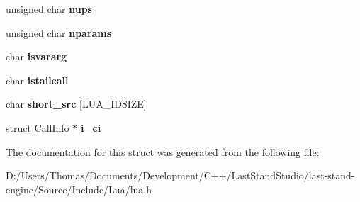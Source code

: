 \begin{DoxyCompactItemize}
\item 
\hypertarget{structlua__Debug_ab87c2a6ef686abf10da683f7e9af1b23}{}unsigned char {\bfseries nups}\label{structlua__Debug_ab87c2a6ef686abf10da683f7e9af1b23}

\item 
\hypertarget{structlua__Debug_adb5efd1576224ce9d14f42f8bfee7a1a}{}unsigned char {\bfseries nparams}\label{structlua__Debug_adb5efd1576224ce9d14f42f8bfee7a1a}

\item 
\hypertarget{structlua__Debug_a943220c57a4dd46dcc1bcd1198cfea88}{}char {\bfseries isvararg}\label{structlua__Debug_a943220c57a4dd46dcc1bcd1198cfea88}

\item 
\hypertarget{structlua__Debug_a08e9cf647790ffeb068db293c7572260}{}char {\bfseries istailcall}\label{structlua__Debug_a08e9cf647790ffeb068db293c7572260}

\item 
\hypertarget{structlua__Debug_a9b953c2fa9ef95a72a9ffc423744e1a4}{}char {\bfseries short\+\_\+src} \mbox{[}L\+U\+A\+\_\+\+I\+D\+S\+I\+Z\+E\mbox{]}\label{structlua__Debug_a9b953c2fa9ef95a72a9ffc423744e1a4}

\item 
\hypertarget{structlua__Debug_a6cfa3d2272ea187b08164b0a2081d59d}{}struct Call\+Info $\ast$ {\bfseries i\+\_\+ci}\label{structlua__Debug_a6cfa3d2272ea187b08164b0a2081d59d}

\end{DoxyCompactItemize}


The documentation for this struct was generated from the following file\+:\begin{DoxyCompactItemize}
\item 
D\+:/\+Users/\+Thomas/\+Documents/\+Development/\+C++/\+Last\+Stand\+Studio/last-\/stand-\/engine/\+Source/\+Include/\+Lua/lua.\+h\end{DoxyCompactItemize}
